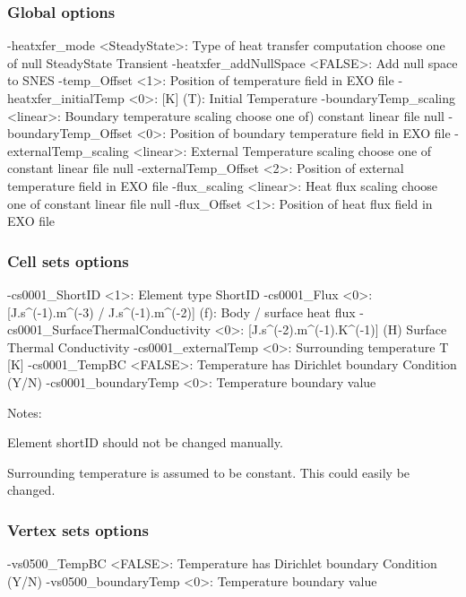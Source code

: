 \documentclass[10pt,oneside]{memoir}
\begin{document}
\subsubsection{Global options}
\small{\begin{boxedverbatim}
-heatxfer_mode <SteadyState>:   Type of heat transfer computation 
                                choose one of null SteadyState Transient
-heatxfer_addNullSpace <FALSE>: Add null space to SNES 
-temp_Offset <1>:               Position of temperature field in EXO file 
-heatxfer_initialTemp <0>:      [K] (T): Initial Temperature 
-boundaryTemp_scaling <linear>: Boundary temperature scaling 
                                choose one of)  constant linear file null
-boundaryTemp_Offset <0>:       Position of boundary temperature field in EXO file 
-externalTemp_scaling <linear>: External Temperature scaling 
                                choose one of constant linear file null
-externalTemp_Offset <2>:       Position of external temperature field in EXO file 
-flux_scaling <linear>:         Heat flux scaling 
                                choose one of constant linear file null
-flux_Offset <1>:               Position of heat flux field in EXO file 
\end{boxedverbatim}}

\subsubsection{Cell sets options}
\small{\begin{boxedverbatim}
-cs0001_ShortID <1>: Element type ShortID 
-cs0001_Flux <0>: [J.s^(-1).m^(-3) / J.s^(-1).m^(-2)] (f): Body / surface heat flux 
-cs0001_SurfaceThermalConductivity <0>: [J.s^(-2).m^(-1).K^(-1)]
                                        (H) Surface Thermal Conductivity 
-cs0001_externalTemp <0>: Surrounding temperature T [K] 
-cs0001_TempBC <FALSE>:   Temperature has Dirichlet boundary Condition (Y/N) 
-cs0001_boundaryTemp <0>: Temperature boundary value 
\end{boxedverbatim}}
Notes:
\begin{compactenum}
\item Element shortID should not be changed manually. 
\item Surrounding temperature is assumed to be constant. This could easily be changed.
\end{compactenum}

\subsubsection{Vertex sets options}
\small{\begin{boxedverbatim}
-vs0500_TempBC <FALSE>:   Temperature has Dirichlet boundary Condition (Y/N) 
-vs0500_boundaryTemp <0>: Temperature boundary value 
\end{boxedverbatim}}
\end{document}
